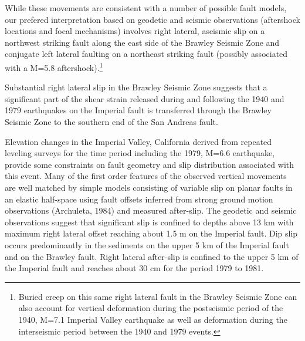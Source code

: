 While these 
movements are consistent with a number of possible fault
models, our prefered interpretation based on geodetic and seismic
observations (aftershock locations and focal mechanisms) 
involves right lateral, aseismic slip on a northwest 
striking fault along the east side of the Brawley Seismic Zone and
conjugate left lateral faulting on a northeast striking fault
(possibly associated with a M=5.8 aftershock).\footnote{Buried creep on this 
same right lateral fault in the Brawley Seismic Zone can also 
account for vertical deformation during the postseismic period of the
1940, M=7.1 Imperial Valley earthquake as well as deformation during the
interseismic period between the 1940 and 1979 events.}

Substantial
right lateral slip in the Brawley Seismic Zone suggests that a
significant part of the shear strain released during and following the
1940 and 1979 earthquakes on the Imperial fault is transferred through
the Brawley Seismic Zone to the southern end of the San Andreas
fault.

Elevation changes in the Imperial Valley, California derived from
repeated leveling surveys for the time period including the 1979,
M=6.6 earthquake, provide some constraints on fault geometry and slip
distribution associated with this event.  Many of the first order
features of the observed vertical movements are well matched by simple
models consisting of variable slip on planar faults in an elastic
half-space using fault offsets
inferred from strong ground motion observations (Archuleta, 1984) and measured
after-slip.  The geodetic and seismic observations suggest that 
significant slip is confined to depths above
13 km with maximum right lateral offset reaching about 1.5 m on the
Imperial fault.  Dip slip occurs predominantly in
the sediments on the upper 5 km of the Imperial fault  and on the
Brawley fault.  Right lateral after-slip is confined to the upper 5 km
of the Imperial fault and reaches about 30 cm for the period 1979 to
1981.


